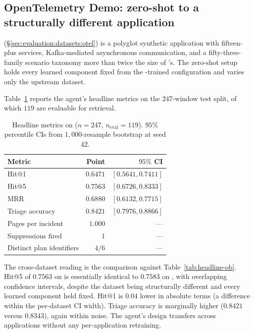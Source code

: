 \subsection{OpenTelemetry Demo: zero-shot to a structurally different application}
\label{sec:cross-app:otel}

\dsotel{} (\S\ref{sec:evaluation:datasets:otel}) is a polyglot synthetic application with fifteen-plus services, Kafka-mediated asynchronous communication, and a fifty-three-family scenario taxonomy more than twice the size of \dsob{}'s. The zero-shot setup holds every learned component fixed from the \dsob{}-trained configuration and varies only the upstream dataset.

Table~\ref{tab:headline-otel} reports the agent's headline metrics on the $247$-window test split, of which $119$ are evaluable for retrieval.

\begin{table}[ht]
  \centering
  \caption{Headline metrics on \dsotel{} ($n=247$, $n_{\text{eval}}=119$). $95\%$ percentile CIs from $1{,}000$-resample bootstrap at seed $42$.}
  \label{tab:headline-otel}
  \small
  \begin{tabular}{lrr}
    \toprule
    Metric & Point & $95\%$ CI \\
    \midrule
    Hit@1                     & $0.6471$ & $[0.5641, 0.7411]$ \\
    Hit@5                     & $0.7563$ & $[0.6726, 0.8333]$ \\
    MRR                       & $0.6880$ & $[0.6132, 0.7715]$ \\
    Triage accuracy           & $0.8421$ & $[0.7976, 0.8866]$ \\
    Pages per incident        & $1.000$  & --- \\
    Suppressions fired        & $1$      & --- \\
    Distinct plan identifiers & $4 / 6$  & --- \\
    \bottomrule
  \end{tabular}
\end{table}

The cross-dataset reading is the comparison against Table~\ref{tab:headline-ob}. Hit@5 of $0.7563$ on \dsotel{} is essentially identical to $0.7583$ on \dsob{}, with overlapping confidence intervals, despite the dataset being structurally different and every learned component held fixed. Hit@1 is $0.04$ lower in absolute terms (a difference within the per-dataset CI width). Triage accuracy is marginally higher ($0.8421$ versus $0.8343$), again within noise. The agent's design transfers across applications without any per-application retraining.

